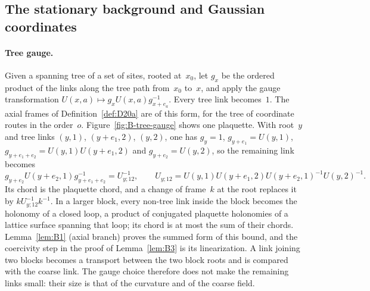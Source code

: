 \subsection{The stationary background and Gaussian coordinates}\label{subsec:B-stationary}

\paragraph{Tree gauge.} Given a spanning tree of a set of sites, rooted at~$x_0$, let $g_x$ be the ordered product of the links along the tree path from~$x_0$ to~$x$, and apply the gauge transformation $U(x,a)\mapsto g_xU(x,a)g_{x+e_a}^{-1}$. Every tree link becomes~$1$. The axial frames of Definition~\ref{def:D20a} are of this form, for the tree of coordinate routes in the order~$o$. Figure~\ref{fig:B-tree-gauge} shows one plaquette. With root~$y$ and tree links $(y,1)$, $(y+e_1,2)$, $(y,2)$, one has $g_y=1$, $g_{y+e_1}=U(y,1)$, $g_{y+e_1+e_2}=U(y,1)U(y+e_1,2)$ and $g_{y+e_2}=U(y,2)$, so the remaining link becomes
\begin{equation*}
g_{y+e_2}U(y+e_2,1)g_{y+e_1+e_2}^{-1}=U_{y;12}^{-1},\qquad
U_{y;12}=U(y,1)U(y+e_1,2)U(y+e_2,1)^{-1}U(y,2)^{-1}.
\end{equation*}
Its chord is the plaquette chord, and a change of frame~$k$ at the root replaces it by $kU_{y;12}^{-1}k^{-1}$. In a larger block, every non-tree link inside the block becomes the holonomy of a closed loop, a product of conjugated plaquette holonomies of a lattice surface spanning that loop; its chord is at most the sum of their chords. Lemma~\ref{lem:B1} (axial branch) proves the summed form of this bound, and the coercivity step in the proof of Lemma~\ref{lem:B3} is its linearization. A link joining two blocks becomes a transport between the two block roots and is compared with the coarse link. The gauge choice therefore does not make the remaining links small: their size is that of the curvature and of the coarse field.

